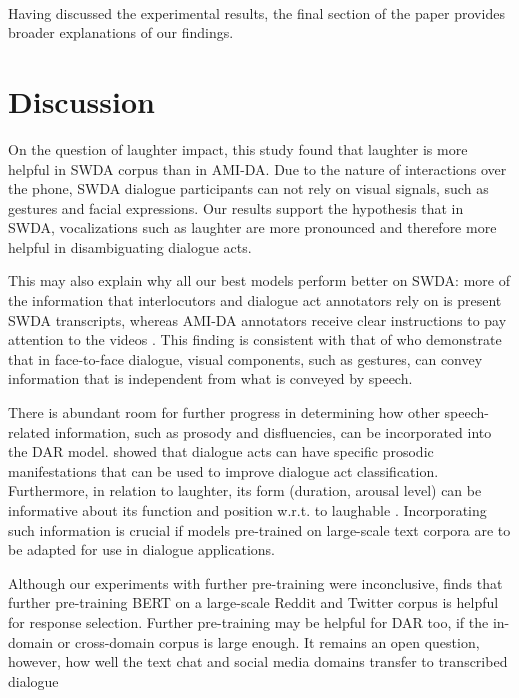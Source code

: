 \documentclass[11pt,a4paper]{article}
\begin{document}
\paragraph{}
Having discussed the experimental results, the final section of the paper provides broader explanations of our findings.

\section{Discussion} %
On the question of laughter impact, this study found that laughter is more helpful in SWDA corpus than in AMI-DA.
Due to the nature of interactions over the phone, SWDA dialogue participants can not rely on visual signals, such as gestures and facial expressions.
Our results support the hypothesis that in SWDA, vocalizations such as laughter are more pronounced and therefore more helpful in disambiguating dialogue acts.

This may also explain why all our best models perform better on SWDA: more of the information that interlocutors and dialogue act annotators rely on is present SWDA transcripts, whereas AMI-DA annotators receive clear instructions to pay attention to the videos \citep{GuidelinesDialogueAct2005}.
This finding is consistent with that of \citet{bavelas2008gesturing} who demonstrate that in face-to-face dialogue, visual components, such as gestures, can convey information that is independent from what is conveyed by speech.

There is abundant room for further progress in determining how other speech-related information, such as prosody and disfluencies, can be incorporated into the DAR model.
\citet{stolckeDialogueActModeling2000} showed that dialogue acts can have specific prosodic manifestations that can be used to improve dialogue act classification.
Furthermore, in relation to laughter, its form (duration, arousal level) can be informative about its function and position w.r.t. to laughable \citep{tian2016we,mazzocconi2019phd}.
Incorporating such information is crucial if models pre-trained on large-scale text corpora are to be adapted for use in dialogue applications.

Although our experiments with further pre-training were inconclusive, \citet{baoPLATOPretrainedDialogue2019} finds that further pre-training BERT on a large-scale Reddit and Twitter corpus is helpful for response selection.
Further pre-training may be helpful for DAR too, if the in-domain or cross-domain corpus is large enough.
It remains an open question, however, how well the text chat and social media domains transfer to transcribed dialogue 
\end{document}
